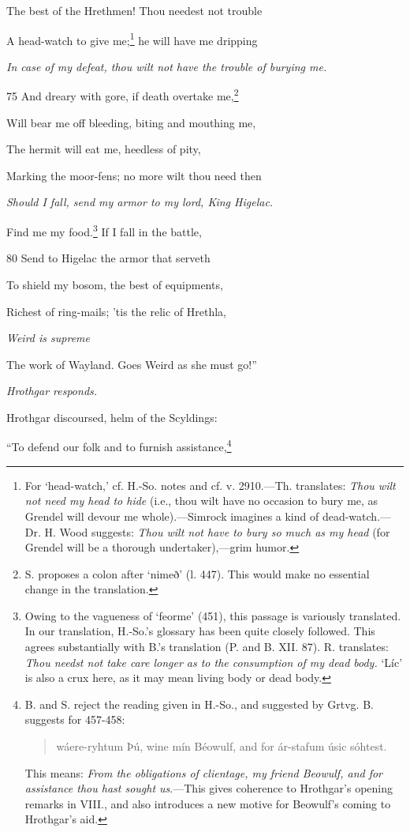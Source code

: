 The best of the Hrethmen! Thou needest not trouble

A head-watch to give me;\footnote{For ‘head-watch,’ cf. H.-So. notes and cf. v. 2910.—Th. translates: \emph{Thou
wilt not need my head to hide} (i.e., thou wilt have no occasion to bury me, as
Grendel will devour me whole).—Simrock imagines a kind of dead-watch.—Dr. H. Wood
suggests: \emph{Thou wilt not have to bury so much as my head} (for
Grendel will be a thorough undertaker),—grim humor.} he will have me dripping

\emph{In case of my defeat,
thou wilt not
have the trouble of
burying me.}

75
And dreary with gore, if death overtake me,\footnote{S. proposes a colon after ‘nimeð’ (l. 447). This would make no essential
change in the translation.}

Will bear me off bleeding, biting and mouthing me,

The hermit will eat me, heedless of pity,

Marking the moor-fens; no more wilt thou need then

\emph{Should I fall, send
my armor to my
lord, King Higelac.}

Find me my food.\footnote{Owing to the vagueness of ‘feorme’ (451), this passage is variously translated.
In our translation, H.-So.’s glossary has been quite closely followed.
This agrees substantially with B.’s translation (P. and B. XII. 87). R. translates:
\emph{Thou needst not take care longer as to the consumption of my dead
body.} ‘Líc’ is also a crux here, as it may mean living body or dead body.} If I fall in the battle,

80
Send to Higelac the armor that serveth

To shield my bosom, the best of equipments,

Richest of ring-mails; ’tis the relic of Hrethla,

\emph{Weird is supreme}

The work of Wayland. Goes Weird as she must go!”



\emph{Hrothgar responds.}

Hrothgar discoursed, helm of the Scyldings:

“To defend our folk and to furnish assistance,\footnote{B. and S. reject the reading given in H.-So., and suggested by Grtvg. B.
suggests for 457-458:

\begin{quote}

wáere-ryhtum Þú, wine mín Béowulf,
and for ár-stafum úsic sóhtest.

\end{quote}

This means: \emph{From the obligations of clientage, my friend Beowulf, and for
assistance thou hast sought us}.—This gives coherence to Hrothgar’s opening
remarks in VIII., and also introduces a new motive for Beowulf’s coming to
Hrothgar’s aid.}

